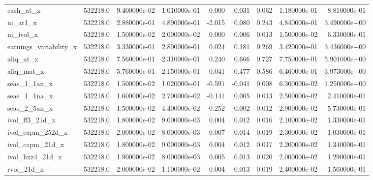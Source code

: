 \documentclass[12pt]{article}
\begin{document}
\begin{landscape}
\begin{longtable}{|l|r|r|r|r|r|r|r|r|}
cash\_at\_x              &  532218.0 &  9.400000e-02 &  1.010000e-01 &       0.000 &        0.031 &        0.062 &  1.180000e-01 &  8.810000e-01 \\
ni\_ar1\_x               &  532218.0 &  2.880000e-01 &  4.890000e-01 &      -2.015 &        0.080 &        0.243 &  4.840000e-01 &  3.490000e+00 \\
ni\_ivol\_x              &  532218.0 &  1.500000e-02 &  2.000000e-02 &       0.000 &        0.006 &        0.013 &  1.500000e-02 &  6.330000e-01 \\
earnings\_variability\_x &  532218.0 &  3.330000e-01 &  2.800000e-01 &       0.024 &        0.181 &        0.269 &  3.420000e-01 &  3.436000e+00 \\
aliq\_at\_x              &  532218.0 &  7.560000e-01 &  2.310000e-01 &       0.240 &        0.666 &        0.727 &  7.750000e-01 &  5.901000e+00 \\
aliq\_mat\_x             &  532218.0 &  5.760000e-01 &  2.150000e-01 &       0.041 &        0.477 &        0.586 &  6.460000e-01 &  3.973000e+00 \\
seas\_1\_1an\_x           &  532218.0 &  1.500000e-02 &  1.020000e-01 &      -0.591 &       -0.041 &        0.008 &  6.300000e-02 &  1.250000e+00 \\
seas\_1\_1na\_x           &  532218.0 &  1.600000e-02 &  2.700000e-02 &      -0.141 &        0.005 &        0.013 &  2.500000e-02 &  2.410000e-01 \\
seas\_2\_5an\_x           &  532218.0 &  1.500000e-02 &  4.400000e-02 &      -0.252 &       -0.002 &        0.012 &  2.900000e-02 &  5.730000e-01 \\
ivol\_ff3\_21d\_x         &  532218.0 &  1.800000e-02 &  9.000000e-03 &       0.004 &        0.012 &        0.016 &  2.100000e-02 &  1.330000e-01 \\
ivol\_capm\_252d\_x       &  532218.0 &  2.000000e-02 &  8.000000e-03 &       0.007 &        0.014 &        0.019 &  2.300000e-02 &  1.030000e-01 \\
ivol\_capm\_21d\_x        &  532218.0 &  1.800000e-02 &  9.000000e-03 &       0.004 &        0.012 &        0.017 &  2.200000e-02 &  1.340000e-01 \\
ivol\_hxz4\_21d\_x        &  532218.0 &  1.900000e-02 &  8.000000e-03 &       0.005 &        0.013 &        0.020 &  2.000000e-02 &  1.290000e-01 \\
rvol\_21d\_x             &  532218.0 &  2.000000e-02 &  1.100000e-02 &       0.004 &        0.013 &        0.019 &  2.400000e-02 &  1.560000e-01 \\

\end{longtable}
\end{landscape}
\end{document}
